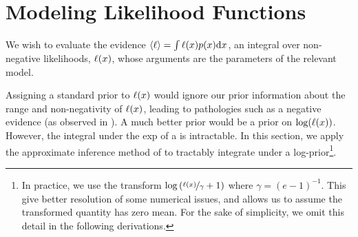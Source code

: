 \documentclass{article}
\begin{document}
\section{Modeling Likelihood Functions}

We wish to evaluate the evidence $\inty{\lfn} = \int \lfn(\lfv) p(\lfv) \ud\lfv$, an integral over non-negative likelihoods, $\lfn(\lfv)$, whose arguments are the parameters of the relevant model.



Assigning a standard \gpb prior to $\lfn(\lfv)$ would ignore our prior information about the range and non-negativity of $\lfn(\lfv)$, leading to pathologies such as a negative evidence (as observed in \citet{BZMonteCarlo}).  A much better prior would be a \gpb prior on $\log(\lfn(x))$.  However, the integral under the exp of a \gpb is intractable.  In this section, we apply the approximate inference method of \citep{BQR} to tractably integrate under a log-\gpb prior\footnote{In practice, we use the transform 
$\log\left(\nicefrac{\lfn(\lfv)}{\gamma} + 1\right)$
where $\gamma = (e-1)^{-1}$.  This give better resolution of some numerical issues, and allows us to assume the transformed quantity has zero mean. For the sake of simplicity, we omit this detail in the following derivations.}.




\end{document}
